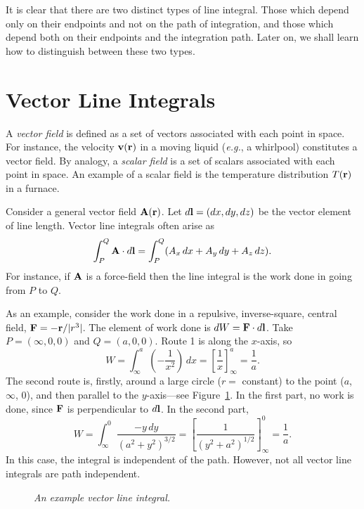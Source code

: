 It is clear that there are two distinct types of line integral. Those which depend only on their
endpoints and not on the path of integration, and those which depend both on their endpoints
and the integration path. Later on, we shall learn how to distinguish between these two types.

\section{Vector Line Integrals}
A {\em vector field} is defined as a set of vectors associated with each point in space.
For instance, the velocity ${\bf v}({\bf r})$ in a moving liquid 
({\em e.g.}, a whirlpool) constitutes
a vector field. By analogy, a {\em scalar field} is a set of scalars associated with each
point in space. An example of a scalar field is the temperature distribution $T({\bf r})$ in
a furnace. 

Consider a general vector field ${\bf A}({\bf r})$. Let $d{\bf l} = (dx,dy,dz)$ be the
vector element of line length. Vector line integrals often arise as 
\begin{equation}
\int_P^Q {\bf A}\cdot d{\bf l} = \int_P^Q (A_x\,dx+A_y\,dy + A_z\,dz).
\end{equation}
For instance, if ${\bf A}$ is a force-field then the line integral is the work done in going from
$P$ to $Q$. 

As an example, consider the work done in a repulsive, inverse-square, 
central field, ${\bf F} = - {\bf r}/ |r^3|$. The 
element of work done  is $dW={\bf F}\cdot d{\bf l}$. 
Take $P=(\infty, 0, 0)$ and $Q=(a,0,0)$. Route 1 is along the $x$-axis, so 
\begin{equation}
W = \int_{\infty}^a \left(-\frac{1}{x^2}\right)\,dx = \left[\frac{1}{x}\right]_{\infty}^a
=\frac{1}{a}.
\end{equation}
The second route is, firstly, around a large circle ($r=$ constant) to the point
($a$, $\infty$, 0), and then parallel to the $y$-axis---see Figure~\ref{f13a}. In the first  part, no work is 
done,
since ${\bf F}$ is perpendicular to $d{\bf l}$. In the second part,
\begin{equation}
W = \int_{\infty}^0 \frac{-y\,dy}{(a^2 + y^2)^{3/2}} = \left[\frac{1}{(y^2+a^2)^{1/2}}
\right]^0_\infty = \frac{1}{a}.
\end{equation}
In this case, the integral is independent of the path. However, not all vector line integrals
are path independent.
\begin{figure}
\centerline{}
\caption{\em An example vector line integral.}\label{f13a}
\end{figure}


